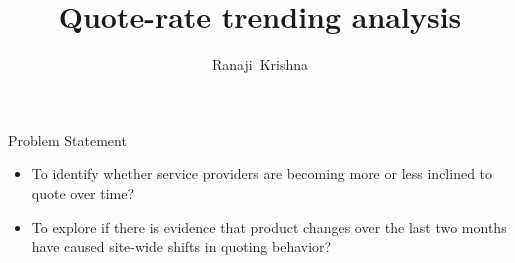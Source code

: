 \documentclass{beamer}
\title{Quote-rate trending analysis}
\author{Ranaji~Krishna}
\begin{document}
\begin{frame}
  \titlepage
\end{frame}




\begin{frame}{Problem Statement}{}
	\begin{itemize}
		\item{To identify whether service providers are becoming more or less inclined to quote over time?}\vspace{0.5 in}
		\item{To explore if there is evidence that product changes over the last two months have caused site-wide shifts in quoting behavior?} \vspace{0.5 in}
	\end{itemize}
\end{frame}
\end{document}
